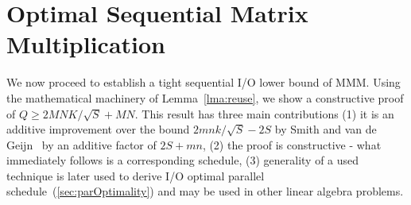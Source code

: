 \documentclass[sigplan,review,anonymous]{acmart}\settopmatter{printfolios=true,printccs=false,printacmref=false}
\newcommand\greg[1]{\textcolor{blue}{[Greg: #1]}}
\newcommand\mac[1]{\textcolor{red}{[Mac: #1]}}
\begin{document}
\section{\hspace{-0.5em}Optimal Sequential Matrix Multiplication}
\label{sec:seqOptimality}

We now proceed to establish a tight sequential I/O lower bound of MMM. Using 
the 
mathematical machinery of 
Lemma~\ref{lma:reuse}, we show a constructive proof of $Q \ge 2MNK/\sqrt{S} + 
MN$. This result has three main contributions (1) it is an additive improvement 
over the bound $2mnk/\sqrt{S} - 2S$ by Smith and van de Geijn~\cite{tightMMM} 
by an
additive factor of $2S + mn$, (2) the proof is constructive - what immediately 
follows is a corresponding schedule, (3) generality of a used technique is 
later used to derive I/O optimal parallel schedule~(\cref{sec:parOptimality}) 
and may be used in other 
linear algebra problems.
%
%
%
%
\end{document}
